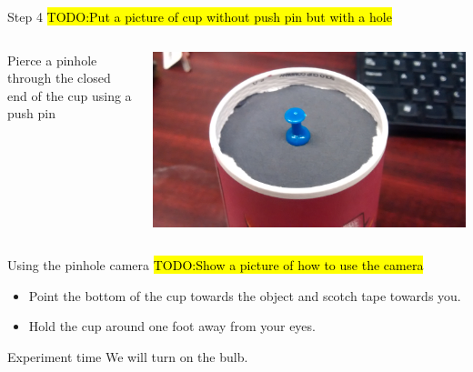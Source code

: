 \begin{frame}{Step 4}
  \hl{TODO:Put a picture of cup without push pin but with a hole}
  \begin{columns}
    \begin{column}{0.6\textwidth}
      Pierce a pinhole through the closed end of the cup using a push pin
    \end{column}
    \begin{column}{0.4\textwidth}
      \includegraphics[width=\textwidth]{media/pushpin.jpg}
    \end{column}
  \end{columns}
\end{frame}

\begin{frame}{Using the pinhole camera}
  \hl{TODO:Show a picture of how to use the camera}
  \begin{itemize}
    \item
      Point the bottom of the cup towards the object and scotch tape towards you.\\
    \item
      Hold the cup around one foot away from your eyes.
  \end{itemize}
\end{frame}

\begin{frame}{Experiment time}
  We will turn on the bulb.
\end{frame}

\begin{frame}
\end{frame}

